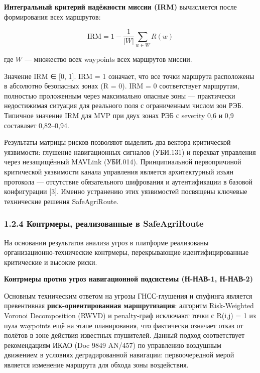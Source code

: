 \textbf{Интегральный критерий надёжности миссии (IRM)} вычисляется после формирования всех маршрутов:

\[\mathrm{IRM} = 1 - \frac{1}{|W|}\sum_{w \in W} R(w)\]

где \(W\) --- множество всех waypoints всех маршрутов миссии.

Значение IRM ∈ {[}0, 1{]}. IRM = 1 означает, что все точки маршрута расположены в абсолютно безопасных зонах (R = 0). IRM = 0 соответствует маршрутам, полностью проложенным через максимально опасные зоны --- практически недостижимая ситуация для реального поля с ограниченным числом зон РЭБ. Типичное значение IRM для MVP при двух зонах РЭБ с severity 0,6 и 0,9 составляет 0,82--0,94.

Результаты матрицы рисков позволяют выделить два вектора критической уязвимости: глушение навигационных сигналов (УБИ.131) и перехват управления через незащищённый MAVLink (УБИ.014). Принципиальной первопричиной критической уязвимости канала управления является архитектурный изъян протокола --- отсутствие обязательного шифрования и аутентификации в базовой конфигурации {[}3{]}. Именно устранению этих уязвимостей посвящены ключевые технические решения SafeAgriRoute.

\hypertarget{ux43aux43eux43dux442ux440ux43cux435ux440ux44b-ux440ux435ux430ux43bux438ux437ux43eux432ux430ux43dux43dux44bux435-ux432-safeagriroute}{%
\subsubsection{1.2.4 Контрмеры, реализованные в SafeAgriRoute}\label{ux43aux43eux43dux442ux440ux43cux435ux440ux44b-ux440ux435ux430ux43bux438ux437ux43eux432ux430ux43dux43dux44bux435-ux432-safeagriroute}}

На основании результатов анализа угроз в платформе реализованы организационно-технические контрмеры, перекрывающие идентифицированные критические и высокие риски.

\textbf{Контрмеры против угроз навигационной подсистемы (Н-НАВ-1, Н-НАВ-2)}

Основным техническим ответом на угрозы ГНСС-глушения и спуфинга является превентивная \textbf{риск-ориентированная маршрутизация}: алгоритм Risk-Weighted Voronoi Decomposition (RWVD) и penalty-граф исключают точки с R(i,j) = 1 из пула waypoints ещё на этапе планирования, что фактически означает отказ от полётов в зоне действия известных глушителей. Данный подход соответствует рекомендациям ИКАО (Doc 9849 AN/457) по управлению воздушным движением в условиях деградированной навигации: первоочередной мерой является изменение маршрута для обхода зоны воздействия.

